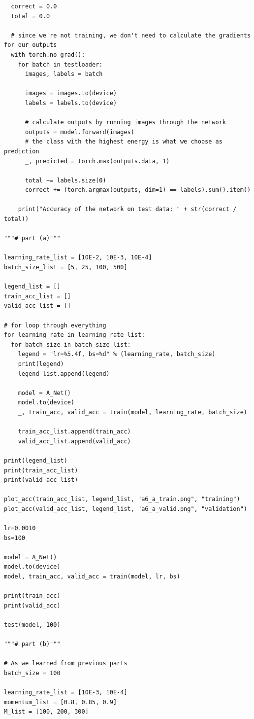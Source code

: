 \documentclass{article}
\newcommand{\1}{\mathbf{1}}
\begin{document}
{\begin{verbatim}
  correct = 0.0
  total = 0.0

  # since we're not training, we don't need to calculate the gradients for our outputs
  with torch.no_grad():
    for batch in testloader:
      images, labels = batch

      images = images.to(device)
      labels = labels.to(device)

      # calculate outputs by running images through the network 
      outputs = model.forward(images)
      # the class with the highest energy is what we choose as prediction
      _, predicted = torch.max(outputs.data, 1)

      total += labels.size(0)
      correct += (torch.argmax(outputs, dim=1) == labels).sum().item()

    print("Accuracy of the network on test data: " + str(correct / total))

"""# part (a)"""

learning_rate_list = [10E-2, 10E-3, 10E-4]
batch_size_list = [5, 25, 100, 500]

legend_list = []
train_acc_list = []
valid_acc_list = []

# for loop through everything 
for learning_rate in learning_rate_list:
  for batch_size in batch_size_list:
    legend = "lr=%5.4f, bs=%d" % (learning_rate, batch_size)
    print(legend)
    legend_list.append(legend)

    model = A_Net()
    model.to(device)
    _, train_acc, valid_acc = train(model, learning_rate, batch_size)

    train_acc_list.append(train_acc)
    valid_acc_list.append(valid_acc)

print(legend_list)
print(train_acc_list)
print(valid_acc_list)

plot_acc(train_acc_list, legend_list, "a6_a_train.png", "training")
plot_acc(valid_acc_list, legend_list, "a6_a_valid.png", "validation")

lr=0.0010
bs=100

model = A_Net()
model.to(device)
model, train_acc, valid_acc = train(model, lr, bs)

print(train_acc)
print(valid_acc)

test(model, 100)

"""# part (b)"""

# As we learned from previous parts
batch_size = 100

learning_rate_list = [10E-3, 10E-4]
momentum_list = [0.8, 0.85, 0.9]
M_list = [100, 200, 300]


\end{verbatim}}
\end{document}
